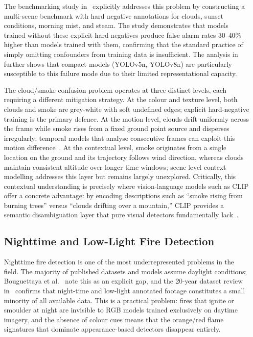 \documentclass[11pt,twocolumn]{article}
\begin{document}
The benchmarking study in~\cite{benchmarking2024} explicitly addresses
this problem by constructing a multi-scene benchmark with hard negative
annotations for clouds, sunset conditions, morning mist, and steam.
The study demonstrates that models trained without these explicit hard
negatives produce false alarm rates 30--40\% higher than models trained
with them, confirming that the standard practice of simply omitting
confounders from training data is insufficient. The analysis
in~\cite{uncertainty2025} further shows that compact models
(YOLOv5n, YOLOv8n) are particularly susceptible to this failure mode
due to their limited representational capacity.

The cloud/smoke confusion problem operates at three distinct levels,
each requiring a different mitigation strategy. At the colour and
texture level, both clouds and smoke are grey-white with soft undefined
edges; explicit hard-negative training is the primary defence.
At the motion level, clouds drift uniformly across the frame while
smoke rises from a fixed ground point source and disperses irregularly;
temporal models that analyse consecutive frames can exploit this
motion difference~\cite{figlib2022}. At the contextual level,
smoke originates from a single location on the ground and its
trajectory follows wind direction, whereas clouds maintain consistent
altitude over longer time windows; scene-level context modelling
addresses this layer but remains largely unexplored. Critically,
this contextual understanding is precisely where vision-language
models such as CLIP offer a concrete advantage: by encoding descriptions
such as ``smoke rising from burning trees'' versus ``clouds drifting
over a mountain,'' CLIP provides a semantic disambiguation layer
that pure visual detectors fundamentally lack~\cite{clip_llava2026}.

\subsection{Nighttime and Low-Light Fire Detection}

Nighttime fire detection is one of the most underrepresented problems
in the field. The majority of published datasets and models assume
daylight conditions; Bouguettaya et al.~\cite{bouguettaya2022} note
this as an explicit gap, and the 20-year dataset review
in~\cite{datasets20years} confirms that night-time and low-light
annotated footage constitutes a small minority of all available data.
This is a practical problem: fires that ignite or smoulder at night
are invisible to RGB models trained exclusively on daytime imagery,
and the absence of colour cues means that the orange/red flame
signatures that dominate appearance-based detectors disappear entirely.
\end{document}
